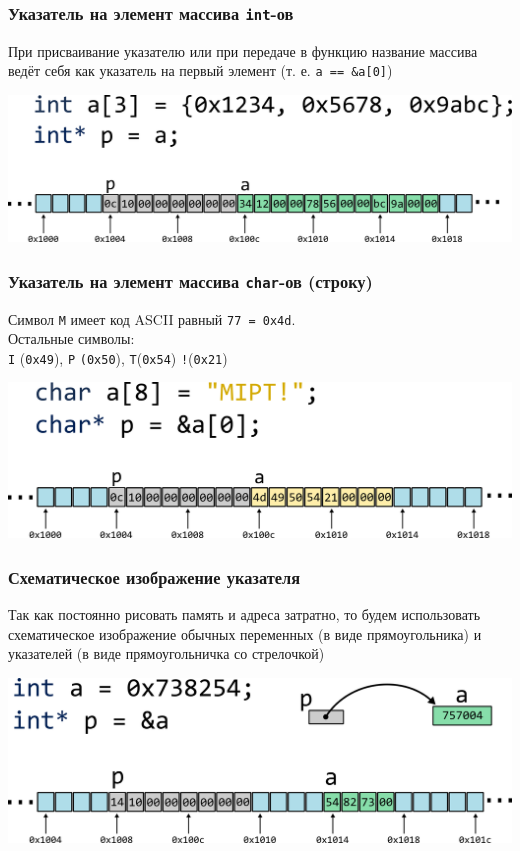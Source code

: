 \documentclass[10pt,pdf,hyperref={unicode}]{beamer}
\begin{document}
\begin{frame}[fragile]
\frametitle{Указатель на элемент массива \texttt{int}-ов} 
При присваивание указателю или при передаче в функцию 
название массива ведёт себя как указатель на первый 
элемент (т. е. \texttt{a == \&a[0]})
\begin{center}
\includegraphics[width=0.86\linewidth]{../images/memory/memory_6_pointer_to_int_array_by_name.png}
\end{center}
\end{frame}

\begin{frame}[fragile]
\frametitle{Указатель на элемент массива \texttt{char}-ов (строку)} 
Символ \texttt{M} имеет код ASCII равный \texttt{77 = 0x4d}.\\
Остальные символы:\\
\texttt{I} (\texttt{0x49}), \texttt{P} \texttt{(0x50}), \texttt{T}(\texttt{0x54}) \texttt{!}(\texttt{0x21})
\begin{center}
\includegraphics[width=0.86\linewidth]{../images/memory/memory_7_pointer_to_char_array.png}
\end{center}
\end{frame}


\begin{frame}[fragile]
\frametitle{Схематическое изображение указателя} 
Так как постоянно рисовать память и адреса затратно,
то будем использовать схематическое изображение обычных переменных (в виде прямоугольника)
 и указателей (в виде прямоугольничка со стрелочкой)
\begin{center}
\includegraphics[width=0.86\linewidth]{../images/memory/memory_8_schematic.png}
\end{center}
\end{frame}
\end{document}
